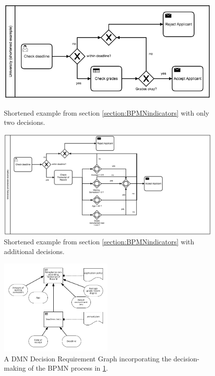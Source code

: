 \begin{figure}
  \centering
    \includegraphics[scale=0.5]{../figures/chapter_indicators/BPMN_Example_Student_Application_Short.png}
    \caption{Shortened example from section \ref{section:BPMNindicators} with only two decisions.}
  \label{fig:BPMNshortenedApplicationEx}
    \includegraphics[scale=0.4]{../figures/chapter_indicators/BPMN_Example_Student_Application_DMN_Short.png}
    \caption{Shortened example from section \ref{section:BPMNindicators} with additional decisions.}
  \label{fig:BPMNexpandedApplicationEx}
\end{figure}

\begin{figure}
\begin{center}
\includegraphics[width=0.5\textwidth]{../figures/chapter_indicators/DMN_Application_Example_Deadline_ToR.png} 
\end{center}
\caption{A DMN Decision Requirement Graph incorporating the decision-making of the BPMN process in \ref{fig:BPMNexpandedApplicationEx}.}
\label{fig:DMN_DRD_Application}
\end{figure}

